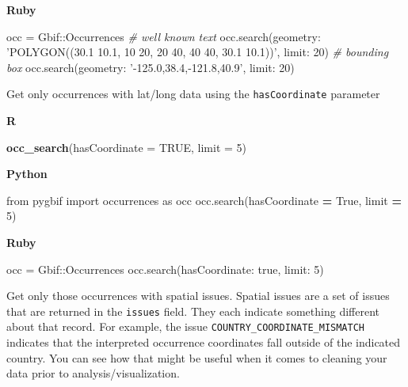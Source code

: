 \documentclass[author-year, review, 11pt]{components/elsarticle} %
\newenvironment{Shaded}{\begin{snugshade}}{\end{snugshade}}
\newcommand{\KeywordTok}[1]{\textcolor[rgb]{0.13,0.29,0.53}{\textbf{#1}}}
\newcommand{\DataTypeTok}[1]{\textcolor[rgb]{0.13,0.29,0.53}{#1}}
\newcommand{\DecValTok}[1]{\textcolor[rgb]{0.00,0.00,0.81}{#1}}
\newcommand{\StringTok}[1]{\textcolor[rgb]{0.31,0.60,0.02}{#1}}
\newcommand{\ImportTok}[1]{#1}
\newcommand{\CommentTok}[1]{\textcolor[rgb]{0.56,0.35,0.01}{\textit{#1}}}
\newcommand{\OtherTok}[1]{\textcolor[rgb]{0.56,0.35,0.01}{#1}}
\newcommand{\VariableTok}[1]{\textcolor[rgb]{0.00,0.00,0.00}{#1}}
\newcommand{\OperatorTok}[1]{\textcolor[rgb]{0.81,0.36,0.00}{\textbf{#1}}}
\newcommand{\NormalTok}[1]{#1}
\begin{document}
\textbf{Ruby}

\begin{Shaded}
\begin{Highlighting}[]
\NormalTok{occ = }\DataTypeTok{Gbif}\NormalTok{::}\DataTypeTok{Occurrences}
\CommentTok{# well known text}
\NormalTok{occ.search(}\StringTok{geometry: 'POLYGON((30.1 10.1, 10 20, 20 40, 40 40, 30.1 10.1))'}\NormalTok{, }\StringTok{limit: }\DecValTok{20}\NormalTok{)}
\CommentTok{# bounding box}
\NormalTok{occ.search(}\StringTok{geometry: '-125.0,38.4,-121.8,40.9'}\NormalTok{, }\StringTok{limit: }\DecValTok{20}\NormalTok{)}
\end{Highlighting}
\end{Shaded}

Get only occurrences with lat/long data using the \texttt{hasCoordinate}
parameter

\textbf{R}

\begin{Shaded}
\begin{Highlighting}[]
\KeywordTok{occ_search}\NormalTok{(}\DataTypeTok{hasCoordinate =} \OtherTok{TRUE}\NormalTok{, }\DataTypeTok{limit =} \DecValTok{5}\NormalTok{)}
\end{Highlighting}
\end{Shaded}

\textbf{Python}

\begin{Shaded}
\begin{Highlighting}[]
\ImportTok{from}\NormalTok{ pygbif }\ImportTok{import}\NormalTok{ occurrences }\ImportTok{as}\NormalTok{ occ}
\NormalTok{occ.search(hasCoordinate }\OperatorTok{=} \VariableTok{True}\NormalTok{, limit }\OperatorTok{=} \DecValTok{5}\NormalTok{)}
\end{Highlighting}
\end{Shaded}

\textbf{Ruby}

\begin{Shaded}
\begin{Highlighting}[]
\NormalTok{occ = }\DataTypeTok{Gbif}\NormalTok{::}\DataTypeTok{Occurrences}
\NormalTok{occ.search(}\StringTok{hasCoordinate: }\DecValTok{true}\NormalTok{, }\StringTok{limit: }\DecValTok{5}\NormalTok{)}
\end{Highlighting}
\end{Shaded}

Get only those occurrences with spatial issues. Spatial issues are a set
of issues that are returned in the \texttt{issues} field. They each
indicate something different about that record. For example, the issue
\texttt{COUNTRY\_COORDINATE\_MISMATCH} indicates that the interpreted
occurrence coordinates fall outside of the indicated country. You can
see how that might be useful when it comes to cleaning your data prior
to analysis/visualization.
\end{document}
